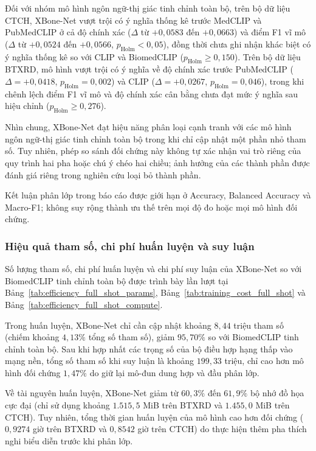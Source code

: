 Đối với nhóm mô hình ngôn ngữ-thị giác tinh chỉnh toàn bộ, trên bộ dữ liệu CTCH, XBone-Net vượt trội có ý nghĩa thống kê trước MedCLIP và PubMedCLIP ở cả độ chính xác ($\Delta$ từ $+0{,}0583$ đến $+0{,}0663$) và điểm F1 vĩ mô ($\Delta$ từ $+0{,}0524$ đến $+0{,}0566$, $p_{\mathrm{Holm}} < 0{,}05$), đồng thời chưa ghi nhận khác biệt có ý nghĩa thống kê so với CLIP và BiomedCLIP ($p_{\mathrm{Holm}} \ge 0{,}150$). Trên bộ dữ liệu BTXRD, mô hình vượt trội có ý nghĩa về độ chính xác trước PubMedCLIP ($\Delta = +0{,}0418$, $p_{\mathrm{Holm}} = 0{,}002$) và CLIP ($\Delta = +0{,}0267$, $p_{\mathrm{Holm}} = 0{,}046$), trong khi chênh lệch điểm F1 vĩ mô và độ chính xác cân bằng chưa đạt mức ý nghĩa sau hiệu chỉnh ($p_{\mathrm{Holm}} \ge 0{,}276$).

Nhìn chung, XBone-Net đạt hiệu năng phân loại cạnh tranh với các mô hình ngôn ngữ-thị giác tinh chỉnh toàn bộ trong khi chỉ cập nhật một phần nhỏ tham số. Tuy nhiên, phép so sánh đối chứng này không tự xác nhận vai trò riêng của quy trình hai pha hoặc chú ý chéo hai chiều; ảnh hưởng của các thành phần được đánh giá riêng trong nghiên cứu loại bỏ thành phần.

Kết luận phân lớp trong báo cáo được giới hạn ở Accuracy, Balanced Accuracy và Macro-F1; không suy rộng thành ưu thế trên mọi độ đo hoặc mọi mô hình đối chứng.

\subsubsection{Hiệu quả tham số, chi phí huấn luyện và suy luận}
\label{subsec:rq1_efficiency_results}
Số lượng tham số, chi phí huấn luyện và chi phí suy luận của XBone-Net so với BiomedCLIP tinh chỉnh toàn bộ được trình bày lần lượt tại Bảng~\ref{tab:efficiency_full_shot_params}, Bảng~\ref{tab:training_cost_full_shot} và Bảng~\ref{tab:efficiency_full_shot_compute}.



Trong huấn luyện, XBone-Net chỉ cần cập nhật khoảng $8{,}44$ triệu tham số (chiếm khoảng $4{,}13\%$ tổng số tham số), giảm $95{,}70\%$ so với BiomedCLIP tinh chỉnh toàn bộ. Sau khi hợp nhất các trọng số của bộ điều hợp hạng thấp vào mạng nền, tổng số tham số khi suy luận là khoảng $199{,}33$ triệu, chỉ cao hơn mô hình đối chứng $1{,}47\%$ do giữ lại mô-đun dung hợp và đầu phân lớp.

Về tài nguyên huấn luyện, XBone-Net giảm từ $60{,}3\%$ đến $61{,}9\%$ bộ nhớ đồ họa cực đại (chỉ sử dụng khoảng $1.515{,}5$ MiB trên BTXRD và $1.455{,}0$ MiB trên CTCH). Tuy nhiên, tổng thời gian huấn luyện của mô hình cao hơn đối chứng ($0{,}9274$ giờ trên BTXRD và $0{,}8542$ giờ trên CTCH) do thực hiện thêm pha thích nghi biểu diễn trước khi phân lớp.

